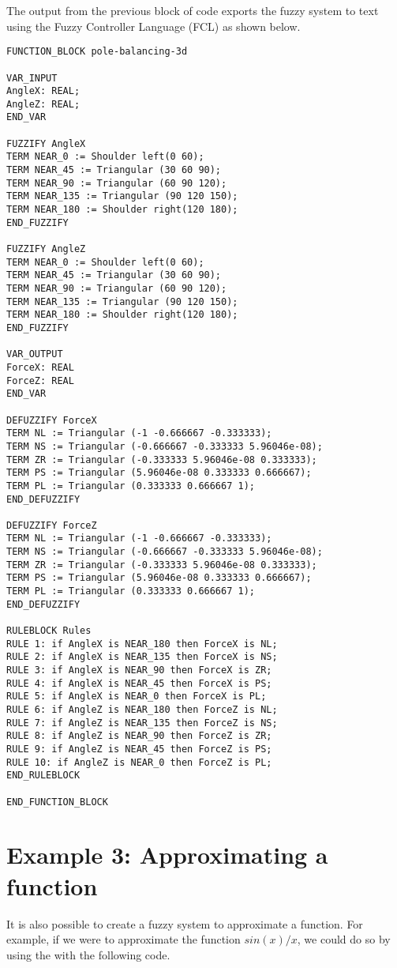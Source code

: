 	The output from the previous block of code exports the fuzzy system to text using the Fuzzy Controller Language (FCL) as shown below. 
	
	\begin{lstlisting}
FUNCTION_BLOCK pole-balancing-3d

VAR_INPUT
AngleX: REAL;
AngleZ: REAL;
END_VAR

FUZZIFY AngleX
TERM NEAR_0 := Shoulder left(0 60);
TERM NEAR_45 := Triangular (30 60 90);
TERM NEAR_90 := Triangular (60 90 120);
TERM NEAR_135 := Triangular (90 120 150);
TERM NEAR_180 := Shoulder right(120 180);
END_FUZZIFY

FUZZIFY AngleZ
TERM NEAR_0 := Shoulder left(0 60);
TERM NEAR_45 := Triangular (30 60 90);
TERM NEAR_90 := Triangular (60 90 120);
TERM NEAR_135 := Triangular (90 120 150);
TERM NEAR_180 := Shoulder right(120 180);
END_FUZZIFY

VAR_OUTPUT
ForceX: REAL
ForceZ: REAL
END_VAR

DEFUZZIFY ForceX
TERM NL := Triangular (-1 -0.666667 -0.333333);
TERM NS := Triangular (-0.666667 -0.333333 5.96046e-08);
TERM ZR := Triangular (-0.333333 5.96046e-08 0.333333);
TERM PS := Triangular (5.96046e-08 0.333333 0.666667);
TERM PL := Triangular (0.333333 0.666667 1);
END_DEFUZZIFY

DEFUZZIFY ForceZ
TERM NL := Triangular (-1 -0.666667 -0.333333);
TERM NS := Triangular (-0.666667 -0.333333 5.96046e-08);
TERM ZR := Triangular (-0.333333 5.96046e-08 0.333333);
TERM PS := Triangular (5.96046e-08 0.333333 0.666667);
TERM PL := Triangular (0.333333 0.666667 1);
END_DEFUZZIFY

RULEBLOCK Rules
RULE 1: if AngleX is NEAR_180 then ForceX is NL;
RULE 2: if AngleX is NEAR_135 then ForceX is NS;
RULE 3: if AngleX is NEAR_90 then ForceX is ZR;
RULE 4: if AngleX is NEAR_45 then ForceX is PS;
RULE 5: if AngleX is NEAR_0 then ForceX is PL;
RULE 6: if AngleZ is NEAR_180 then ForceZ is NL;
RULE 7: if AngleZ is NEAR_135 then ForceZ is NS;
RULE 8: if AngleZ is NEAR_90 then ForceZ is ZR;
RULE 9: if AngleZ is NEAR_45 then ForceZ is PS;
RULE 10: if AngleZ is NEAR_0 then ForceZ is PL;
END_RULEBLOCK

END_FUNCTION_BLOCK		
	\end{lstlisting}

	\section{Example 3: Approximating a function}
	It is also possible to create a fuzzy system to approximate a function. For example, if we were to approximate the function $sin (x) / x$, we could do so by using the  with the following code.
	

